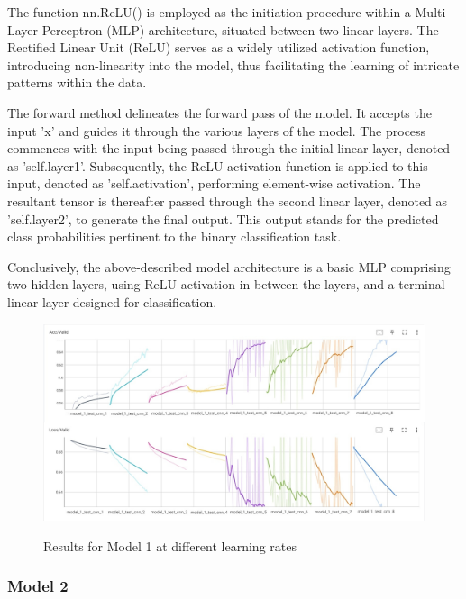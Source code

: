 The function nn.ReLU() is employed as the initiation procedure within a Multi-Layer Perceptron (MLP) architecture, situated between two linear layers. The Rectified Linear Unit (ReLU) serves as a widely utilized activation function, introducing non-linearity into the model, thus facilitating the learning of intricate patterns within the data.

The forward method delineates the forward pass of the model. It accepts the input 'x' and guides it through the various layers of the model. The process commences with the input being passed through the initial linear layer, denoted as 'self.layer1'. Subsequently, the ReLU activation function is applied to this input, denoted as 'self.activation', performing element-wise activation. The resultant tensor is thereafter passed through the second linear layer, denoted as 'self.layer2', to generate the final output. This output stands for the predicted class probabilities pertinent to the binary classification task.

Conclusively, the above-described model architecture is a basic MLP comprising two hidden layers, using ReLU activation in between the layers, and a terminal linear layer designed for classification.







\begin{center}
    \begin{figure}[!h]
        \centering
        \includegraphics[width=\textwidth]{images/exp1_acc1+loss1.jpg}
        \label{fig:exp1_model1}
        \caption{Results for Model 1 at different learning rates}
    \end{figure}
\end{center}



\subsubsection{Model 2}


